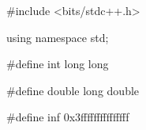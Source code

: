 \#include <bits/stdc++.h>\par
using namespace std;\par
\#define int long long\par
\#define double long double\par
\#define inf 0x3fffffffffffffff\par
